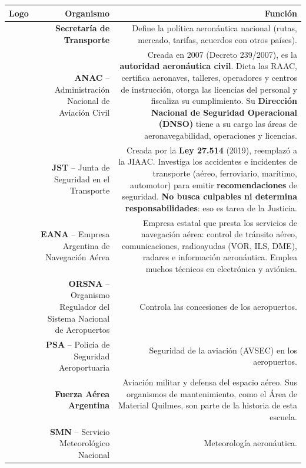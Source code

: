 \begin{center}
\footnotesize
\renewcommand{\arraystretch}{1.05}
\begin{tabular}{|M{0.20}|N{0.18}|N{0.52}|}
\hline
\textbf{Logo} & \textbf{Organismo} & \textbf{Función} \\ \hline
{} & \textbf{Secretaría de Transporte} & Define la política aeronáutica nacional (rutas, mercado,
tarifas, acuerdos con otros países). \\ \hline
{} & \textbf{ANAC} -- Administración Nacional de Aviación Civil & Creada en 2007 (Decreto 239/2007),
es la \textbf{autoridad aeronáutica civil}. Dicta las RAAC, certifica aeronaves, talleres,
operadores y centros de instrucción, otorga las licencias del personal y fiscaliza su
cumplimiento. Su \textbf{Dirección Nacional de Seguridad Operacional (DNSO)} tiene a su cargo
las áreas de aeronavegabilidad, operaciones y licencias. \\ \hline
{} & \textbf{JST} -- Junta de Seguridad en el Transporte & Creada por la \textbf{Ley 27.514} (2019),
reemplazó a la JIAAC. Investiga los accidentes e incidentes de transporte (aéreo, ferroviario,
marítimo, automotor) para emitir \textbf{recomendaciones} de seguridad. \textbf{No busca culpables
ni determina responsabilidades}: eso es tarea de la Justicia. \\ \hline
{} & \textbf{EANA} -- Empresa Argentina de Navegación Aérea & Empresa estatal que presta los
servicios de navegación aérea: control de tránsito aéreo, comunicaciones, radioayudas (VOR, ILS,
DME), radares e información aeronáutica. Emplea muchos técnicos en electrónica y aviónica. \\
\hline
{} & \textbf{ORSNA} -- Organismo Regulador del Sistema Nacional de Aeropuertos & Controla las
concesiones de los aeropuertos. \\ \hline
{} & \textbf{PSA} -- Policía de Seguridad Aeroportuaria & Seguridad de la aviación (AVSEC) en los
aeropuertos. \\ \hline
{} & \textbf{Fuerza Aérea Argentina} & Aviación militar y defensa del espacio aéreo. Sus organismos
de mantenimiento, como el Área de Material Quilmes, son parte de la historia de esta escuela. \\
\hline
{} & \textbf{SMN} -- Servicio Meteorológico Nacional & Meteorología aeronáutica. \\ \hline
\end{tabular}
\end{center}

